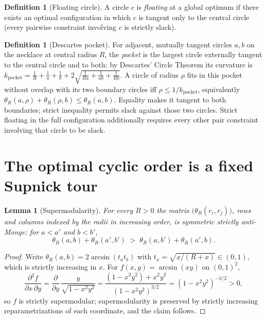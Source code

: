 \documentclass[11pt]{article}
\newtheorem{lemma}[theorem]{Lemma}
\theoremstyle{definition}
\newtheorem{definition}[theorem]{Definition}
\theoremstyle{remark}
\DeclareMathOperator{\asin}{arcsin}
\begin{document}
\begin{definition}[Floating circle]
A circle $c$ is \emph{floating} at a global optimum if there exists an optimal configuration in which $c$ is tangent only to the central circle (every pairwise constraint involving $c$ is strictly slack).
\end{definition}

\begin{definition}[Descartes pocket]
For adjacent, mutually tangent circles $a,b$ on the necklace at central radius $R$, the \emph{pocket} is the largest circle externally tangent to the central circle and to both: by Descartes' Circle Theorem its curvature is
$k_{\mathrm{pocket}}=\frac1R+\frac1a+\frac1b+2\sqrt{\frac1{Ra}+\frac1{ab}+\frac1{Rb}}$.
A circle of radius $\rho$ fits in this pocket without overlap with its two boundary circles iff $\rho\le 1/k_{\mathrm{pocket}}$, equivalently $\theta_R(a,\rho)+\theta_R(\rho,b)\le\theta_R(a,b)$. Equality makes it tangent to both boundaries; strict inequality permits slack against those two circles. Strict floating in the full configuration additionally requires every other pair constraint involving that circle to be slack.
\end{definition}

\section{The optimal cyclic order is a fixed Supnick tour}\label{sec:theoremA}

\begin{lemma}[Supermodularity]\label{lem:supermodular}
For every $R>0$ the matrix $\big(\theta_R(r_i,r_j)\big)$, rows and columns indexed by the radii in increasing order, is symmetric strictly anti-Monge: for $a<a'$ and $b<b'$,
\[
\theta_R(a,b)+\theta_R(a',b') \;>\; \theta_R(a,b')+\theta_R(a',b).
\]
\end{lemma}

\begin{proof}
Write $\theta_R(a,b)=2\asin(t_a t_b)$ with $t_x=\sqrt{x/(R+x)}\in(0,1)$, which is strictly increasing in $x$. For $f(x,y)=\asin(xy)$ on $(0,1)^2$,
\[
\frac{\partial^2 f}{\partial x\,\partial y}
=\frac{\partial}{\partial y}\,\frac{y}{\sqrt{1-x^2y^2}}
=\frac{(1-x^2y^2)+x^2y^2}{(1-x^2y^2)^{3/2}}
=(1-x^2y^2)^{-3/2}>0,
\]
so $f$ is strictly supermodular; supermodularity is preserved by strictly increasing reparametrizations of each coordinate, and the claim follows.
\end{proof}
\end{document}
